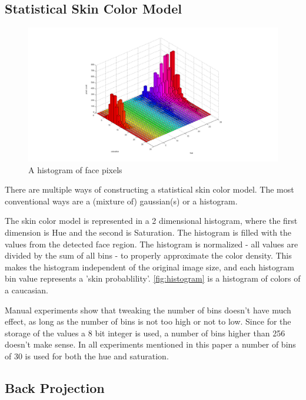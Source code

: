 \subsection*{Statistical Skin Color Model}

\begin{figure}[htbp]
    \center{}
    \includegraphics[width=1\textwidth]{figures/pipeline/histogram.png}
	\caption{A histogram of face pixels}
	\label{fig:histogram}
\end{figure}

There are multiple ways of constructing a statistical skin color model. The most conventional ways are a (mixture of) gaussian(s) or a histogram. 

The skin color model is represented in a 2 dimensional histogram, where the first dimension is Hue and the second is Saturation. The histogram is filled with the values from the detected face region. The histogram is normalized - all values are divided by the sum of all bins - to properly approximate the color density. This makes the histogram independent of the original image size, and each histogram bin value represents a 'skin probablility'. \autoref{fig:histogram} is a histogram of colors of a caucasian.

Manual experiments show that tweaking the number of bins doesn't have much effect, as long as the number of bins is not too high or not to low. Since for the storage of the values a 8 bit integer is used, a number of bins higher than 256 doesn't make sense. In all experiments mentioned in this paper a number of bins of 30 is used for both the hue and saturation.

\subsection*{Back Projection}

